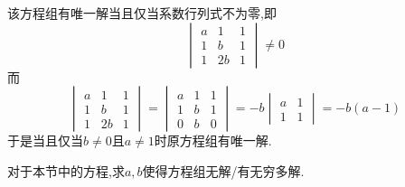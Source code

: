 \documentclass{ctexart}
\begin{document}
\begin{solution}
    该方程组有唯一解当且仅当系数行列式不为零,即
    \[\begin{vmatrix}
        a&1&1\\
        1&b&1\\
        1&2b&1
    \end{vmatrix}\neq0\]
    而
    \[\begin{vmatrix}
            a&1&1\\
            1&b&1\\
            1&2b&1
        \end{vmatrix}
    =\begin{vmatrix}
        a&1&1\\
        1&b&1\\
        0&b&0
    \end{vmatrix}=-b\begin{vmatrix}
        a&1\\
        1&1
    \end{vmatrix}=-b(a-1)\]
    于是当且仅当$b\neq0$且$a\neq1$时原方程组有唯一解.
\end{solution}
\begin{homework}[6]
    对于本节中的方程,求$a,b$使得方程组无解/有无穷多解.
\end{homework}
\end{document}
